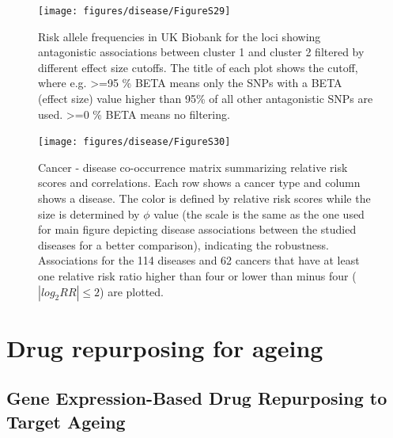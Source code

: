 \documentclass[12pt,twoside]{unicam}
\begin{document}
\begin{figure}

{\centering \texttt{[image: figures/disease/FigureS29]} 

}

\caption[Risk allele frequencies in UK Biobank for the loci showing antagonistic associations between cluster 1 and cluster 2 filtered by different effect size cutoffs.]{Risk allele frequencies in UK Biobank for the loci showing antagonistic associations between cluster 1 and cluster 2 filtered by different effect size cutoffs. The title of each plot shows the cutoff, where e.g. >=95 \% BETA means only the SNPs with a BETA (effect size) value higher than 95\% of all other antagonistic SNPs are used. >=0 \% BETA means no filtering.}\label{fig:disFigS29}
\end{figure}

\begin{figure}

{\centering \texttt{[image: figures/disease/FigureS30]} 

}

\caption[Cancer - disease co-occurrence matrix summarizing relative risk scores and correlations.]{Cancer - disease co-occurrence matrix summarizing relative risk scores and correlations. Each row shows a cancer type and column shows a disease. The color is defined by relative risk scores while the size is determined by $\phi$ value (the scale is the same as the one used for main figure depicting disease associations between the studied diseases for a better comparison), indicating the robustness. Associations for the 114 diseases and 62 cancers that have at least one relative risk ratio higher than four or lower than minus four ($|log_2RR| ≤ 2$) are plotted.}\label{fig:disFigS30}
\end{figure}
\newpage

\hypertarget{drug-repurposing-for-ageing-2}{%
\section{Drug repurposing for ageing}\label{drug-repurposing-for-ageing-2}}

\hypertarget{gene-expression-based-drug-repurposing-to-target-ageing-1}{%
\subsection{Gene Expression-Based Drug Repurposing to Target Ageing}\label{gene-expression-based-drug-repurposing-to-target-ageing-1}}
\end{document}
